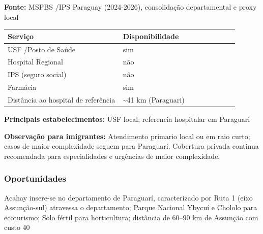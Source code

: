 \textbf{Fonte:} MSPBS /\allowbreak  IPS Paraguay (2024-2026), consolidação
departamental e proxy local

{\def\LTcaptype{none} %
\begin{longtable}{@{}>{\raggedright\arraybackslash}p{0.45\linewidth} >{\raggedright\arraybackslash}p{0.45\linewidth}@{}}
\toprule\noalign{}
Serviço & Disponibilidade \\
\midrule\noalign{}
\endhead
\bottomrule\noalign{}
\endlastfoot
USF /\allowbreak  Posto de Saúde & sim \\
Hospital Regional & não \\
IPS (seguro social) & não \\
Farmácia & sim \\
Distância ao hospital de referência & \textasciitilde41 km
(Paraguari) \\
\end{longtable}
}

\textbf{Principais estabelecimentos:} USF local; referencia hospitalar
em Paraguari

\textbf{Observação para imigrantes:} Atendimento primario local ou em
raio curto; casos de maior complexidade seguem para Paraguari. Cobertura
privada continua recomendada para especialidades e urgências de maior
complexidade.
\newpage

\subsubsection*{Oportunidades}\label{oport-acahay-0902}
Acahay insere-se no departamento de Paraguarí, caracterizado por Ruta 1 (eixo Assunção-sul) atravessa o departamento; Parque Nacional Ybycuí e Chololo para ecoturismo; Solo fértil para horticultura; distância de 60–90 km de Assunção com custo 40%


